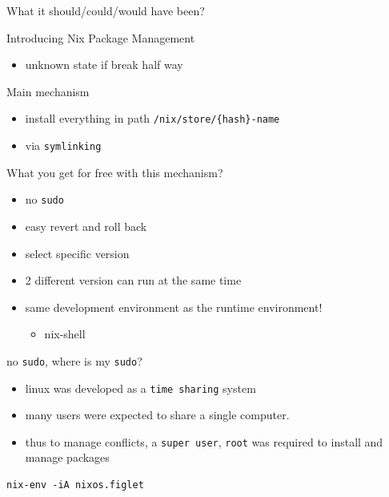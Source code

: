 \documentclass[presentation]{beamer}
\begin{document}
\begin{frame}[label={sec:org72632d2},fragile]{What it should/could/would have been?}
\begin{block}{Introducing Nix Package Management}
\begin{itemize}
\begin{itemize}
\begin{itemize}
\item unknown state if break half way
\end{itemize}
\end{itemize}
\end{itemize}
\end{block}
\begin{block}{Main mechanism}
\begin{itemize}
\item install everything in path \texttt{/nix/store/\{hash\}-name}
\item via \texttt{symlinking}
\end{itemize}
\end{block}
\begin{block}{What you get for free with this mechanism?}
\begin{itemize}
\item no \texttt{sudo}
\item easy revert and roll back
\item select specific version
\item 2 different version can run at the same time
\item same \alert{development} environment as the \alert{runtime} environment!
\begin{itemize}
\item nix-shell
\end{itemize}
\end{itemize}
\begin{block}{no \texttt{sudo}, where is my \texttt{sudo}?}
\begin{itemize}
\item linux was developed as a \texttt{time sharing} system
\item many users were expected to share a single computer.
\item thus to manage conflicts, a \texttt{super user}, \texttt{root} was required to
install and manage packages
\end{itemize}
\begin{verbatim}
nix-env -iA nixos.figlet
\end{verbatim}
\end{block}


\end{block}
\end{frame}
\end{document}
